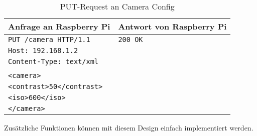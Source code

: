 \begin{table}[h!]
	\centering
	\begin{tabular}{|l|l|}
		\hline	Anfrage an Raspberry Pi 			& Antwort von Raspberry Pi	\\ 
		\hline 	\verb|PUT /camera HTTP/1.1| 		& \verb|200 OK| 			\\
				\verb|Host: 192.168.1.2| 		 	& 							\\
				\verb|Content-Type: text/xml|	 	&  							\\
													&  							\\
				\verb|<camera>|	 				 	&  							\\
				\verb|<contrast>50</contrast>|	 	&  							\\
				\verb|<iso>600</iso>|	 			&  							\\
				\verb|</camera>|	 				&  							\\ 
		\hline 
	\end{tabular} 
	\caption{PUT-Request an Camera Config}
	\label{tab:put-camera-config}
\end{table}

Zusätzliche Funktionen können mit diesem Design einfach implementiert werden.